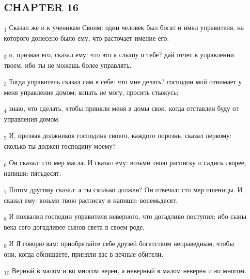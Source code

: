 \subsection{CHAPTER 16}
\begin{tcolorbox}
\textsubscript{1} Сказал же и к ученикам Своим: один человек был богат и имел управителя, на которого донесено было ему, что расточает имение его;
\end{tcolorbox}
\begin{tcolorbox}
\textsubscript{2} и, призвав его, сказал ему: что это я слышу о тебе? дай отчет в управлении твоем, ибо ты не можешь более управлять.
\end{tcolorbox}
\begin{tcolorbox}
\textsubscript{3} Тогда управитель сказал сам в себе: что мне делать? господин мой отнимает у меня управление домом; копать не могу, просить стыжусь;
\end{tcolorbox}
\begin{tcolorbox}
\textsubscript{4} знаю, что сделать, чтобы приняли меня в домы свои, когда отставлен буду от управления домом.
\end{tcolorbox}
\begin{tcolorbox}
\textsubscript{5} И, призвав должников господина своего, каждого порознь, сказал первому: сколько ты должен господину моему?
\end{tcolorbox}
\begin{tcolorbox}
\textsubscript{6} Он сказал: сто мер масла. И сказал ему: возьми твою расписку и садись скорее, напиши: пятьдесят.
\end{tcolorbox}
\begin{tcolorbox}
\textsubscript{7} Потом другому сказал: а ты сколько должен? Он отвечал: сто мер пшеницы. И сказал ему: возьми твою расписку и напиши: восемьдесят.
\end{tcolorbox}
\begin{tcolorbox}
\textsubscript{8} И похвалил господин управителя неверного, что догадливо поступил; ибо сыны века сего догадливее сынов света в своем роде.
\end{tcolorbox}
\begin{tcolorbox}
\textsubscript{9} И Я говорю вам: приобретайте себе друзей богатством неправедным, чтобы они, когда обнищаете, приняли вас в вечные обители.
\end{tcolorbox}
\begin{tcolorbox}
\textsubscript{10} Верный в малом и во многом верен, а неверный в малом неверен и во многом.
\end{tcolorbox}

